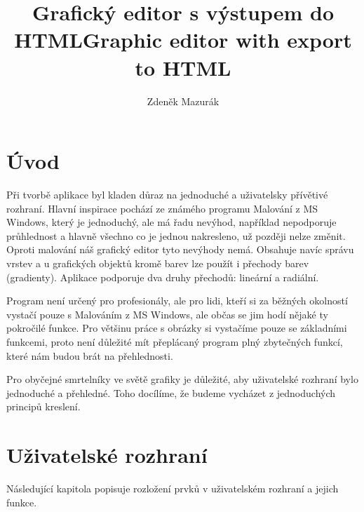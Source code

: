 \documentclass[
  field=inf,
  biblatex,
  glossaries,
  index
]{kidiplom}
\title{Grafický editor s výstupem do HTML}
\title[english]{Graphic editor with export to HTML}
\subtitle{}
\subtitle[english]{}
\author{Zdeněk Mazurák}
\begin{document}
\maketitle



\newcommand{\BibLaTeX}{\textsc{Bib}\LaTeX}

\section{Úvod}

Při tvorbě aplikace byl kladen důraz na jednoduché a uživatelsky přívětivé rozhraní. Hlavní inspirace pochází ze známého programu Malování z MS Windows, který je jednoduchý, ale má řadu nevýhod, například nepodporuje průhlednost a hlavně všechno co je jednou nakresleno, už později nelze změnit. Oproti malování náš grafický editor tyto nevýhody nemá. Obsahuje navíc správu vrstev a u grafických objektů kromě barev lze použít i přechody barev (gradienty). Aplikace podporuje dva druhy přechodů: lineární a radiální.

Program není určený pro profesionály, ale pro lidi, kteří si za běžných okolností vystačí pouze s Malováním z MS Windows, ale občas se jim hodí nějaké ty pokročilé funkce. Pro většinu práce s obrázky si vystačíme pouze se základními funkcemi, proto není důležité mít přeplácaný program plný zbytečných funkcí, které nám budou brát na přehlednosti.

Pro obyčejné smrtelníky ve světě grafiky je důležité, aby uživatelské rozhraní bylo jednoduché a přehledné. Toho docílíme, že budeme vycházet z jednoduchých principů kreslení.

\newpage

\section{Uživatelské rozhraní}

Následující kapitola popisuje rozložení prvků v uživatelském rozhraní a jejich funkce.
\end{document}
